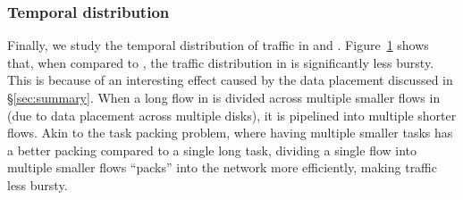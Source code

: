 \subsubsection{Temporal distribution}
Finally, we study the temporal distribution of traffic in \dis and \pdis. Figure~\ref{fig:td} shows that, when compared to \pdis, the traffic distribution in \dis is significantly less bursty. This is because of an interesting effect caused by the data placement discussed in \S\ref{sec:summary}. When a long flow in \pdis is divided across multiple smaller flows in \dis (due to data placement across multiple disks), it is pipelined into multiple shorter flows. Akin to the task packing problem, where having multiple smaller tasks has a better packing compared to a single long task, dividing a single flow into multiple smaller flows ``packs'' into the network more efficiently, making traffic less bursty.
%
\begin{figure}
  \centering
  \caption{\small{}}
  \label{fig:td}
\end{figure}
%


